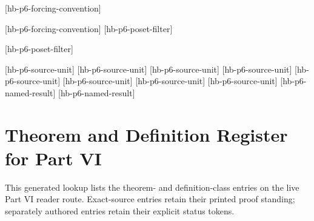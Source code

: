 










[hb-p6-forcing-convention]{%
  \label{def:p06-forcing-order-orientation}}

[hb-p6-forcing-convention]
[hb-p6-poset-filter]{%
  \label{def:p06-poset-filter}}

[hb-p6-poset-filter]













[hb-p6-source-unit]
[hb-p6-source-unit]
[hb-p6-source-unit]
[hb-p6-source-unit]
[hb-p6-source-unit]
[hb-p6-source-unit]
[hb-p6-source-unit]
[hb-p6-source-unit]
[hb-p6-named-result]
[hb-p6-named-result]









\section*{Theorem and Definition Register for Part VI}
\label{sec:p06-theorem-definition-register}

This generated lookup lists the theorem- and definition-class entries on the
live Part VI reader route. Exact-source entries retain their printed proof
standing; separately authored entries retain their explicit status tokens.

